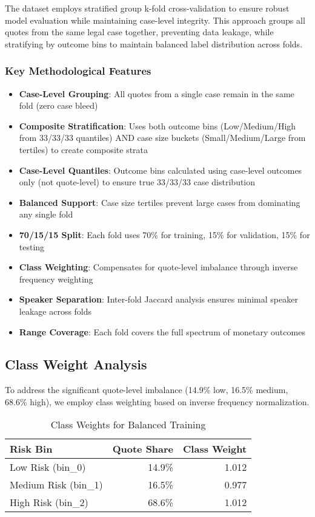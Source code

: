 \documentclass[11pt]{article}
\begin{document}
The dataset employs stratified group k-fold cross-validation to ensure robust model evaluation while maintaining case-level integrity. This approach groups all quotes from the same legal case together, preventing data leakage, while stratifying by outcome bins to maintain balanced label distribution across folds.

\subsubsection{Key Methodological Features}
\begin{itemize}
\item \textbf{Case-Level Grouping}: All quotes from a single case remain in the same fold (zero case bleed)
\item \textbf{Composite Stratification}: Uses both outcome bins (Low/Medium/High from 33/33/33 quantiles) AND case size buckets (Small/Medium/Large from tertiles) to create composite strata
\item \textbf{Case-Level Quantiles}: Outcome bins calculated using case-level outcomes only (not quote-level) to ensure true 33/33/33 case distribution
\item \textbf{Balanced Support}: Case size tertiles prevent large cases from dominating any single fold
\item \textbf{70/15/15 Split}: Each fold uses 70\% for training, 15\% for validation, 15\% for testing
\item \textbf{Class Weighting}: Compensates for quote-level imbalance through inverse frequency weighting
\item \textbf{Speaker Separation}: Inter-fold Jaccard analysis ensures minimal speaker leakage across folds
\item \textbf{Range Coverage}: Each fold covers the full spectrum of monetary outcomes
\end{itemize}

\subsection{Class Weight Analysis}

To address the significant quote-level imbalance (14.9\% low, 16.5\% medium, 68.6\% high), we employ class weighting based on inverse frequency normalization.

\begin{table}[H]
\centering
\caption{Class Weights for Balanced Training}
\begin{tabular}{lrr}
\toprule
\textbf{Risk Bin} & \textbf{Quote Share} & \textbf{Class Weight} \\
\midrule
Low Risk (bin\_0) & 14.9\% & 1.012 \\
Medium Risk (bin\_1) & 16.5\% & 0.977 \\
High Risk (bin\_2) & 68.6\% & 1.012 \\
\bottomrule
\end{tabular}
\end{table}
\end{document}
